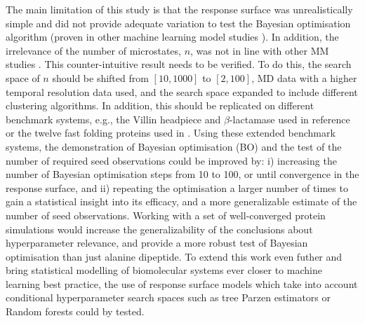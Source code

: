 The main limitation of this study is that the response surface was unrealistically simple and did not provide adequate variation to test the Bayesian optimisation algorithm (proven in other machine learning model studies \cite{bergstraAlgorithmsHyperParameterOptimizationa,bergstrajamesbergstraRandomSearchHyperParameter2012}).  In addition, the irrelevance of the number of microstates, $n$, was not in line with other MM studies \cite{mcgibbonStatisticalModelSelection2014a,wuVariationalApproachLearning2020c,mcgibbonVariationalCrossvalidationSlow2015}. This counter-intuitive result needs to be verified. To do this, the search space of $n$ should be shifted from $[10, 1000]$ to $[2, 100]$, MD data with a higher temporal resolution data used, and the search space expanded to include different clustering algorithms.  In addition, this should be replicated on different benchmark systems, e.g., the Villin headpiece and $\beta$-lactamase used in reference \cite{bowmanQuantitativeComparisonAlternative2013} or the twelve fast folding proteins used in \cite{husicOptimizedParameterSelection2016, schererPyEMMASoftwarePackage2015a, husicWardClusteringImproves2017a}. Using these extended benchmark systems, the demonstration of Bayesian optimisation (BO) and the test of the number of required seed observations could be improved by: i) increasing the number of Bayesian optimisation steps from \num{10} to \num{100}, or until convergence in the response surface, and ii) repeating the optimisation a larger number of times to gain a statistical insight into its efficacy, and a more generalizable estimate of the number of seed observations. Working with a set of well-converged protein simulations would increase the generalizability of the conclusions about hyperparameter relevance, and provide a more robust test of Bayesian optimisation than just alanine dipeptide.  To extend this work even futher and bring statistical modelling of biomolecular systems ever closer to machine learning best practice, the use of response surface models which take into account conditional hyperparameter search spaces such as tree Parzen estimators or Random forests could by tested.

